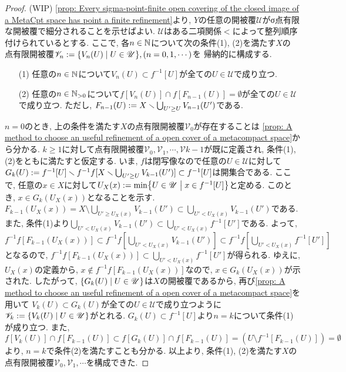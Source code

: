 \documentclass[uplatex, dvipdfmx, a4paper, 12pt, class=jsbook, crop=false]{standalone}
\begin{document}
\begin{proof}
	(WIP)
	\cref{prop: Every sigma-point-finite open covering of the closed image of a MetaCpt space 
	has point a finite refinement}より,
	$ Y $の任意の開被覆$ \mathscr{U} $がσ点有限な開被覆で細分されることを示せばよい.
	$ \mathscr{U} $はある二項関係$ < $によって整列順序付けられているとする.
	ここで, 各$ n \in \mathbb{N} $について次の条件(1), (2)を満たす$ X $の
	点有限開被覆$ \mathscr{V}_n \defeq \setcomp{V_n(U)}{U \in \mathscr{U}}, (n=0, 1, \cdots) $を
	帰納的に構成する.
	\begin{enumerate}
		\item[(1)] 任意の$ n \in \mathbb{N} $について$ V_n(U) \subset f^{-1}[U] $が全ての$ U \in \mathscr{U} $で成り立つ.
		\item[(2)] 任意の$ n \in \mathbb{N}_{>0} $について$ f[V_n(U)] \cap f[F_{n-1}(U)] = \emptyset $が全ての$ U \in \mathscr{U} $で成り立つ. 
		ただし, $ F_{n-1}(U) \mathrel{:=} X \smallsetminus \bigcup_{U' \geq U} V_{n-1}(U') $である. 
	\end{enumerate}
	$ n = 0 $のとき, 上の条件を満たす$ X $の点有限開被覆$ \mathscr{V}_0 $が存在することは
	\cref{prop: A method to choose an useful refinement of a open cover of a metacompact space}から分かる.
	$ k \geq 1 $に対して点有限開被覆$ \mathscr{V}_0, \mathscr{V}_1, \cdots, \mathscr{V}{k-1} $が既に定義され, 
	条件(1), (2)をともに満たすと仮定する.
	いま, $ f $は閉写像なので任意の$ U \in \mathscr{U} $に対して$ G_k(U) \mathrel{:=} f^{-1}[U] 
	\smallsetminus f^{-1}f[X \smallsetminus \bigcup_{U' \geq U} V_{k-1}(U')] \subset f^{-1}[U] $は開集合である.
	ここで, 任意の$ x \in X $に対して$ U_X(x) \defeq \min \setcomp{U \in \mathscr{U}}{x \in f^{-1}[U]} $と定める.
	このとき, $ x \in G_k(U_X(x)) $となることを示す.
	$ F_{k-1}(U_X(x)) = X \setminus \bigcup_{U' \geq U_X(x)} V_{k-1}(U') \subset \bigcup_{U' < U_X(x)} V_{k-1}(U') $である.
	また, 条件(1)より$ \bigcup_{U' < U_X(x)} V_{k-1}(U') \subset \bigcup_{U' < U_X(x)} f^{-1}[U'] $である.
	よって, $ f^{-1}f[F_{k-1}(U_X(x))] \subset f^{-1}f[\bigcup_{U' < U_X(x)} V_{k-1}(U')] 
	\subset f^{-1}f[\bigcup_{U' < U_X(x)} f^{-1}[U']] $となるので,
	$ f^{-1}f[F_{k-1}(U_X(x))] \subset \bigcup_{U' < U_X(x)} f^{-1}[U'] $が得られる.
	ゆえに, $ U_X(x) $の定義から, $ x \notin f^{-1}f[F_{k-1}(U_X(x))] $なので,
	$ x \in G_k(U_X(x)) $が示された. したがって, $ \setcomp{G_{k}(U)}{U \in \mathscr{U}} $は$ X $の開被覆であるから,
	再び\cref{prop: A method to choose an useful refinement of a open cover of a metacompact space}を用いて
	$ V_k(U) \subset G_k(U) $が全ての$ U \in \mathscr{U} $で成り立つように
	$ \mathscr{V}_k \defeq \setcomp{V_k(U)}{U \in \mathscr{U}} $がとれる.
	$ G_k(U) \subset f^{-1}[U] $より$ n = k $について条件(1)が成り立つ.
	また, $ f[V_k(U)] \cap f[F_{k-1}(U)] \subset f[G_k(U)] \cap f[F_{k-1}(U)] 
	= \left(U \setminus f^{-1}[F_{k-1}(U)] \right) = \emptyset $より, 
	$ n = k $で条件(2)を満たすことも分かる.
	以上より, 条件(1), (2)を満たす$ X $の点有限開被覆$ \mathscr{V}_0, \mathscr{V}_1, \cdots $を構成できた.


\end{proof}
\end{document}
